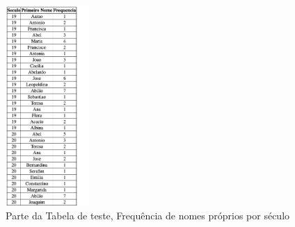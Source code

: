 \documentclass[a4paper, 12pt]{article}
\begin{document}
\begin{figure}[H]
    \centering
    \includegraphics[height=3in]{freq_proprios_sec-tabela.png}
    \caption{Parte da Tabela de teste, Frequência de nomes próprios por século}
    \label{fig:my_label}
\end{figure}
\newpage
\end{document}
